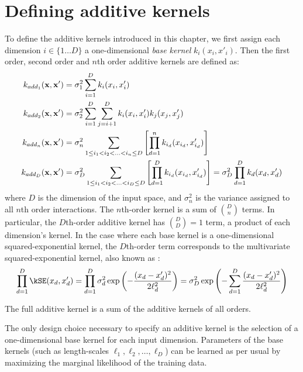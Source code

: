 



\section{Defining additive kernels}

To define the additive kernels introduced in this chapter, we first assign each dimension $i \in \{1 \dots D\}$ a one-dimensional \emph{base kernel} $k_i(x_i, x'_i)$.
Then the first order, second order and $n$th order additive kernels are defined as:
%
\begin{align}
k_{add_1}({\bf x, x'}) & = \sigma_1^2 \sum_{i=1}^D k_i(x_i, x_i') \\
k_{add_2}({\bf x, x'}) & = \sigma_2^2 \sum_{i=1}^D \sum_{j = i + 1}^D k_i(x_i, x_i') k_j(x_j, x_j') \\
k_{add_n}({\bf x, x'}) & = \sigma_n^2 \sum_{1 \leq i_1 < i_2 < ... < i_n \leq D} \left[ \prod_{d=1}^n k_{i_d}(x_{i_d}, x_{i_d}') \right] \\
k_{add_D}({\bf x, x'}) & = \sigma_D^2 \sum_{1 \leq i_1 < i_2 < ... < i_D \leq D} \left[ \prod_{d=1}^D k_{i_d}(x_{i_d}, x_{i_d}') \right] = \sigma_D^2 \prod_{d=1}^D k_{d}(x_{d}, x_{d}')
\end{align}
%
where $D$ is the dimension of the input space, and $\sigma_n^2$ is the variance assigned to all $n$th order interactions.
The $n$th-order kernel is a sum of ${D \choose n}$ terms.
In particular, the $D$th-order additive kernel has ${D \choose D} = 1$ term, a product of each dimension's kernel.
In the case where each base kernel is a one-dimensional squared-exponential kernel, the $D$th-order term corresponds to the multivariate squared-exponential kernel, also known as \seard{}:
%
\begin{align}
\prod_{d=1}^D \kSE(x_d, x_d') = 
\prod_{d=1}^D \sigma_d^2\exp \left( -\frac{ ( x_{d} - x_{d}')^2}{2 \ell^2_d} \right) = 
\sigma_D^2 \exp \left( -\sum_{d=1}^D \frac{ ( x_{d} - x_{d}')^2}{2 \ell^2_d} \right)
\end{align}
%

The full additive kernel is a sum of the additive kernels of all orders.

The only design choice necessary to specify an additive kernel is the selection of a one-dimensional base kernel for each input dimension.
Parameters of the base kernels (such as length-scales $\ell_1, \ell_2, \dots, \ell_D$) can be learned as per usual by maximizing the marginal likelihood of the training data.

